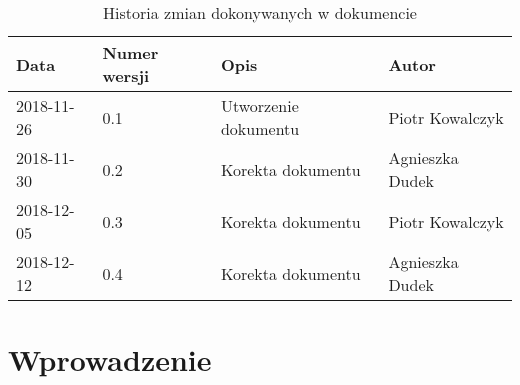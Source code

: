 \documentclass{article}
\begin{document}
\begin{titlepage}






\end{titlepage}

\addtocounter{page}{1}
\newpage

\begin{table}[h!]
	\begin{center}
		\caption{Historia zmian dokonywanych w dokumencie}
		\begin{tabular}{|l|l|l|l|}
			\hline
			Data & Numer wersji & Opis & Autor \\
			\hline \hline
			2018-11-26 & 0.1 & Utworzenie dokumentu & Piotr Kowalczyk \\
			\hline 
			2018-11-30 & 0.2 & Korekta dokumentu & Agnieszka Dudek \\
			\hline
			2018-12-05 & 0.3 & Korekta dokumentu & Piotr Kowalczyk \\
			\hline
			2018-12-12 & 0.4 & Korekta dokumentu & Agnieszka Dudek \\
			\hline
    \end{tabular}
	\end{center}
\end{table}	

\tableofcontents

\newpage


\section{Wprowadzenie}
\end{document}
